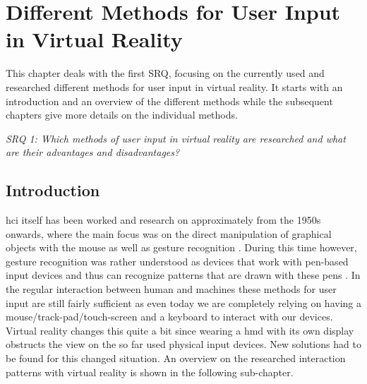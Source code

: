 
\section{Different Methods for User Input in Virtual Reality}

\label{SectionLiteratureReviewSRQ1}

This chapter deals with the first SRQ, focusing on the currently used and researched different methods for user input in virtual reality. It starts with an introduction and an overview of the different methods while the subsequent chapters give more details on the individual methods.
\begin{framed}
	\textit{SRQ 1: Which methods of user input in virtual reality are researched and what are their advantages and disadvantages?}
\end{framed}

\subsection{Introduction}

\gls{hci} itself has been worked and research on approximately from the 1950s onwards, where the main focus was on the direct manipulation of graphical objects with the mouse as well as gesture recognition \citep{Myers1998}. During this time however, gesture recognition was rather understood as devices that work with pen-based input devices and thus can recognize patterns that are drawn with these pens \citep{Myers1998}. In the regular interaction between human and machines these methods for user input are still fairly sufficient as even today we are completely relying on having a mouse/track-pad/touch-screen and a keyboard to interact with our devices. \newline
Virtual reality changes this quite a bit since wearing a \gls{hmd} with its own display obstructs the view on the so far used physical input devices. New solutions had to be found for this changed situation. An overview on the researched interaction patterns with virtual reality is shown in the following sub-chapter.



